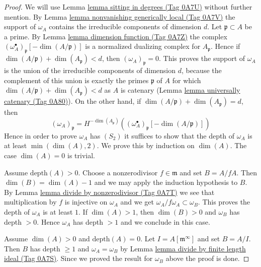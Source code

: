 \documentclass{amsart}
\theoremstyle{plain}
\theoremstyle{definition}
\theoremstyle{remark}
\numberwithin{equation}{subsection}
\begin{document}
\begin{proof}
We will use Lemma \href{https://stacks.math.columbia.edu/tag/0A7U}{lemma sitting in degrees (Tag 0A7U)} without further mention.
By Lemma \href{https://stacks.math.columbia.edu/tag/0A7V}{lemma nonvanishing generically local (Tag 0A7V)} the support
of $\omega_A$ contains the irreducible components of dimension $d$.
Let $\mathfrak p \subset A$ be a prime. By Lemma \href{https://stacks.math.columbia.edu/tag/0A7Z}{lemma dimension function (Tag 0A7Z)}
the complex $(\omega_A^\bullet)_{\mathfrak p}[-\dim(A/\mathfrak p)]$
is a normalized dualizing complex for $A_\mathfrak p$. Hence if
$\dim(A/\mathfrak p) + \dim(A_\mathfrak p) < d$, then
$(\omega_A)_\mathfrak p = 0$.
This proves the support of $\omega_A$ is the union of the irreducible
components of dimension $d$, because the complement of this union
is exactly the primes $\mathfrak p$ of $A$ for which
$\dim(A/\mathfrak p) + \dim(A_\mathfrak p) < d$ as $A$ is catenary
(Lemma \href{https://stacks.math.columbia.edu/tag/0A80}{lemma universally catenary (Tag 0A80)}).
On the other hand, if $\dim(A/\mathfrak p) + \dim(A_\mathfrak p) = d$, then
$$
(\omega_A)_\mathfrak p =
H^{-\dim(A_\mathfrak p)}\left(
(\omega_A^\bullet)_{\mathfrak p}[-\dim(A/\mathfrak p)] \right)
$$
Hence in order to prove $\omega_A$ has $(S_2)$ it suffices to show that
the depth of $\omega_A$ is at least $\min(\dim(A), 2)$.
We prove this by induction on $\dim(A)$. The case $\dim(A) = 0$ is
trivial.

\medskip\noindent
Assume $\text{depth}(A) > 0$. Choose a nonzerodivisor $f \in \mathfrak m$
and set $B = A/fA$. Then $\dim(B) = \dim(A) - 1$ and we may apply the
induction hypothesis to $B$. By Lemma \href{https://stacks.math.columbia.edu/tag/0A7T}{lemma divide by nonzerodivisor (Tag 0A7T)}
we see that multiplication by $f$ is injective on $\omega_A$ and we get
$\omega_A/f\omega_A \subset \omega_B$. This proves the depth of $\omega_A$
is at least $1$. If $\dim(A) > 1$, then $\dim(B) > 0$ and $\omega_B$
has depth $ > 0$. Hence $\omega_A$ has depth $> 1$ and we conclude in
this case.

\medskip\noindent
Assume $\dim(A) > 0$ and $\text{depth}(A) = 0$. Let
$I = A[\mathfrak m^\infty]$ and set $B = A/I$. Then $B$ has
depth $\geq 1$ and $\omega_A = \omega_B$ by
Lemma \href{https://stacks.math.columbia.edu/tag/0A7S}{lemma divide by finite length ideal (Tag 0A7S)}.
Since we proved the result for $\omega_B$ above the proof is done.
\end{proof}
\end{document}
